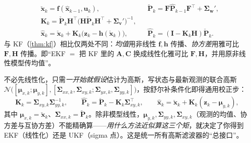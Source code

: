\begin{proposition}[EKF 递归]\label{prop:ekf}
\begin{align}
  &\check{\mathbf{x}}_k=\mathbf{f}(\hat{\mathbf{x}}_{k-1},\mathbf{u}_k), &
  &\check{\mathbf{P}}_k=\mathbf{F}\hat{\mathbf{P}}_{k-1}\mathbf{F}^\top+\boldsymbol{\Sigma}_{\mathbf{w}}', \label{eq:ekf-predict}\\
  &\mathbf{K}_k=\check{\mathbf{P}}_k\mathbf{H}^\top\big(\mathbf{H}\check{\mathbf{P}}_k\mathbf{H}^\top+\boldsymbol{\Sigma}_{\mathbf{v}}'\big)^{-1},\\
  &\hat{\mathbf{x}}_k=\check{\mathbf{x}}_k+\mathbf{K}_k\big(\mathbf{z}_k-\mathbf{h}(\check{\mathbf{x}}_k)\big), &
  &\hat{\mathbf{P}}_k=(\mathbf{I}-\mathbf{K}_k\mathbf{H})\check{\mathbf{P}}_k. \label{eq:ekf-correct}
\end{align}
与 KF（\cref{thm:kf}）相比仅两处不同：\emph{均值}用非线性 $\mathbf{f},\mathbf{h}$ 传播、\emph{协方差}用雅可比 $\mathbf{F},\mathbf{H}$ 传播。即“EKF $=$ 把 KF 里的 $\mathbf{A},\mathbf{C}$ 换成线性化雅可比 $\mathbf{F},\mathbf{H}$，并用原非线性模型传均值”\cite{gaoxiang2019slam14}。
\end{proposition}

\begin{proposition}\label{prop:ggf}
不必先线性化，只需\emph{一开始就假设}估计为高斯，写状态与最新观测的联合高斯
$\mathcal{N}\big([\boldsymbol{\mu}_{x,k};\boldsymbol{\mu}_{y,k}],[\boldsymbol{\Sigma}_{xx,k},\boldsymbol{\Sigma}_{xy,k};\boldsymbol{\Sigma}_{yx,k},\boldsymbol{\Sigma}_{yy,k}]\big)$，按舒尔补条件化即得通用校正步\cite{barfoot2024state}：
\begin{equation}
  \mathbf{K}_k=\boldsymbol{\Sigma}_{xy,k}\boldsymbol{\Sigma}_{yy,k}^{-1},\qquad
  \hat{\mathbf{P}}_k=\check{\mathbf{P}}_k-\mathbf{K}_k\boldsymbol{\Sigma}_{xy,k}^\top,\qquad
  \hat{\mathbf{x}}_k=\check{\mathbf{x}}_k+\mathbf{K}_k(\mathbf{z}_k-\boldsymbol{\mu}_{y,k}),
  \label{eq:ggf}
\end{equation}
其中 $\boldsymbol{\mu}_{x,k}=\check{\mathbf{x}}_k$、$\boldsymbol{\Sigma}_{xx,k}=\check{\mathbf{P}}_k$。除非模型线性，$\boldsymbol{\mu}_{y,k},\boldsymbol{\Sigma}_{yy,k},\boldsymbol{\Sigma}_{xy,k}$（观测的均值、协方差与互协方差）不能精确算——\emph{用什么方法近似算这三个矩}，就决定了你得到 EKF（线性化）还是 UKF（sigma 点）。这是统一所有高斯滤波器的“总接口”。
\end{proposition}

